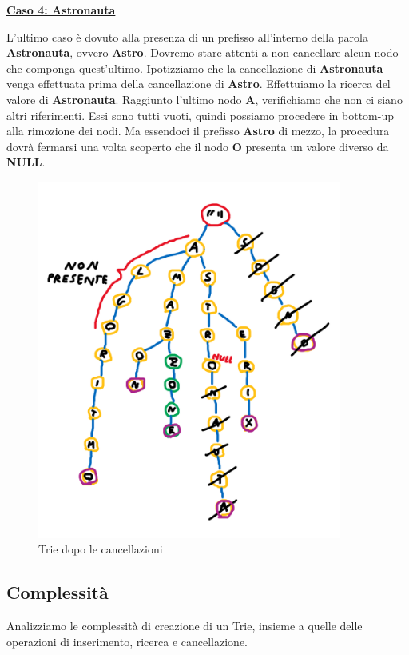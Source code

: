 \documentclass[a4paper, 12pt]{article}
\begin{document}
\vspace{5mm}

\textbf{\underline{Caso 4: Astronauta}}

\vspace{5mm}
L'ultimo caso è dovuto alla presenza di un prefisso all'interno della parola \textbf{Astronauta}, ovvero \textbf{Astro}. Dovremo stare attenti a non cancellare alcun nodo che componga quest'ultimo. Ipotizziamo che la cancellazione di \textbf{Astronauta} venga effettuata prima della cancellazione di \textbf{Astro}. Effettuiamo la ricerca del valore di \textbf{Astronauta}. Raggiunto l'ultimo nodo \textbf{A}, verifichiamo che non ci siano altri riferimenti. Essi sono tutti vuoti, quindi possiamo procedere in bottom-up alla rimozione dei nodi. Ma essendoci il prefisso \textbf{Astro} di mezzo, la procedura dovrà fermarsi una volta scoperto che il nodo \textbf{O} presenta un valore diverso da \textbf{NULL}.

\clearpage

\begin{figure}
    \centering
    \includegraphics[width=10cm]{Images/dopo cancellazione.png}
    \caption{Trie dopo le cancellazioni}
    \label{fig:afterdelete}
\end{figure}

\clearpage

\subsection{Complessità}
Analizziamo le complessità di creazione di un Trie, insieme a quelle delle operazioni di inserimento, ricerca e cancellazione.
\end{document}
